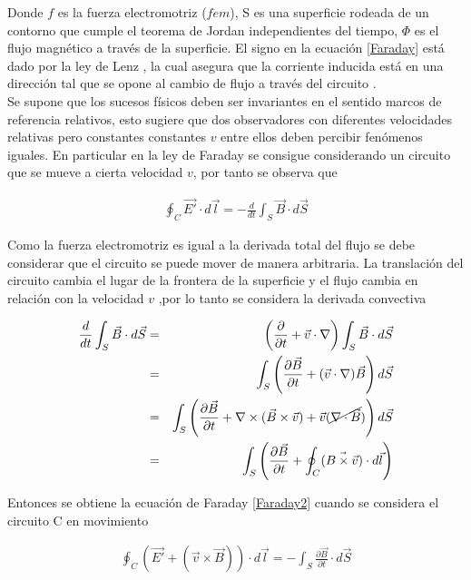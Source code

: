 Donde $f$ es la fuerza electromotriz ($fem$), S es una superficie rodeada de un contorno que cumple el teorema de Jordan \cite{Rudin} independientes del tiempo, $\Phi$ es el flujo magnético a través de la superficie. El signo en la ecuación \eqref{Faraday} está dado por la ley de Lenz \cite{Purcell}, la cual asegura que  la corriente inducida está en una dirección tal que se opone al cambio de flujo a través del circuito .\\

Se supone que los sucesos físicos deben ser invariantes en el sentido marcos de referencia relativos, esto sugiere que dos observadores con diferentes velocidades relativas pero constantes constantes $v$ entre ellos  deben percibir fenómenos iguales. En particular en la ley de Faraday se consigue considerando un circuito que se mueve a cierta velocidad $v$, por tanto se observa que 

\begin{eqnarray}
\label{Faraday2}
    \oint_{C} \vec{E'}\cdot d\vec{l} = -\frac{d }{dt}\int_{S}\vec{B}\cdot d\vec{S}
\end{eqnarray}

Como la fuerza electromotriz es igual a la derivada total del flujo se debe considerar que el circuito se puede mover de manera arbitraria. La translación del circuito cambia el lugar de la frontera de la superficie y el flujo cambia en relación con la velocidad $v$ ,por lo tanto se considera la derivada convectiva

\begin{eqnarray}
    \frac{d }{dt}\int_{S}\vec{B}\cdot d\vec{S} &=& \left(\frac{\partial}{\partial t} + \vec{v}\cdot\nabla\right)\int_{S}\vec{B}\cdot d\vec{S}\nonumber\\
    &=& \int_{S}\left(\frac{\partial \vec{B}}{\partial t} + (\vec{v}\cdot\nabla)\vec{B}\right)d\vec{S}\nonumber \\
    &=&\int_{S}\left(\frac{\partial \vec{B}}{\partial t} + \nabla \times (\vec{B} \times \vec{v}) +\vec{v}(\cancel{\nabla \cdot \vec{B}})\right)d\vec{S}\nonumber \\
    &=&\int_{S}\left(\frac{\partial \vec{B}}{\partial t} + \oint_{C}(\vec{B\times \vec{v}})\cdot d\vec{l}\right)
\end{eqnarray}

Entonces se obtiene la ecuación de Faraday \eqref{Faraday2} cuando se considera el circuito C en movimiento 

\begin{eqnarray}
    \oint_{C} \left(\vec{E'} + (\vec{v}\times \vec{B})\right)\cdot d\vec{l} = -\int_{S}\frac{\partial \vec{B}}{\partial t}\cdot d\vec{S}
\end{eqnarray}

